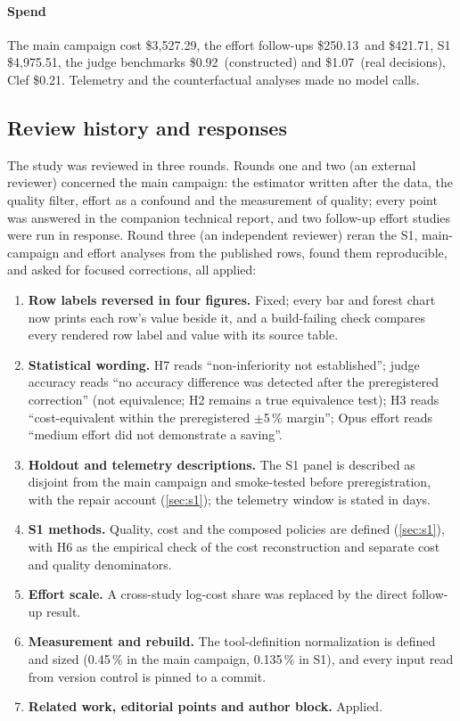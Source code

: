 \documentclass[11pt,letterpaper]{article}
\newcommand{\ClSpend}{0.21}
\newcommand{\EcSpend}{250.13}
\newcommand{\EfSpend}{421.71}
\newcommand{\NormShareMain}{0.45}
\newcommand{\NormShareSone}{0.135}
\newcommand{\SSpend}{4{,}975.51}
\newcommand{\SpendLedger}{3{,}527.29}
\newcommand{\LoggedSpendTotal}{0.92}
\newcommand{\TrSpendTotal}{1.07}
\begin{document}
\paragraph{Spend} The main campaign cost \$\SpendLedger, the effort follow-ups \$\EcSpend\ and \$\EfSpend, S1
\$\SSpend, the judge benchmarks \$\LoggedSpendTotal\ (constructed) and \$\TrSpendTotal\ (real decisions), Clef
\$\ClSpend. Telemetry and the counterfactual analyses made no model calls.
\subsection{Review history and responses}\label{sec:review}

The study was reviewed in three rounds. Rounds one and two (an external reviewer) concerned the main campaign: the
estimator written after the data, the quality filter, effort as a confound and the measurement of quality; every
point was answered in the companion technical report, and two follow-up effort studies were run in response. Round
three (an independent reviewer) reran the S1, main-campaign and effort analyses from the published rows, found them
reproducible, and asked for focused corrections, all applied:
\begin{enumerate}[leftmargin=1.6em]
  \item \textbf{Row labels reversed in four figures.} Fixed; every bar and forest chart now prints each row's value
    beside it, and a build-failing check compares every rendered row label and value with its source table.
  \item \textbf{Statistical wording.} H7 reads ``non-inferiority not established''; judge accuracy reads ``no accuracy
    difference was detected after the preregistered correction'' (not equivalence; H2 remains a true equivalence
    test); H3 reads ``cost-equivalent within the preregistered $\pm$5\,\% margin''; Opus effort reads ``medium effort
    did not demonstrate a saving''.
  \item \textbf{Holdout and telemetry descriptions.} The S1 panel is described as disjoint from the main campaign and
    smoke-tested before preregistration, with the repair account (\cref{sec:s1}); the telemetry window is stated in days.
  \item \textbf{S1 methods.} Quality, cost and the composed policies are defined (\cref{sec:s1}), with H6 as the
    empirical check of the cost reconstruction and separate cost and quality denominators.
  \item \textbf{Effort scale.} A cross-study log-cost share was replaced by the direct follow-up result.
  \item \textbf{Measurement and rebuild.} The tool-definition normalization is defined and sized (\NormShareMain\,\% in
    the main campaign, \NormShareSone\,\% in S1), and every input read from version control is pinned to a commit.
  \item \textbf{Related work, editorial points and author block.} Applied.
\end{enumerate}
\end{document}
